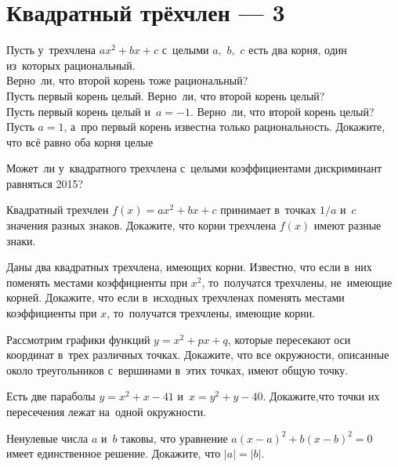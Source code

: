 
\section*{Квадратный трёхчлен --- 3}


\begingroup
    \def\abs#1{\lvert #1 \rvert}

\begin{problems}

\item
Пусть у~трехчлена $ax^2 + bx + c$ с~целыми $a,$ $b,$ $c$ есть два корня, один
из~которых рациональный.
\\
\subproblem
Верно~ли, что второй корень тоже рациональный?
\\
\subproblem
Пусть первый корень целый.
Верно~ли, что второй корень целый?
\\
\subproblem
Пусть первый корень целый и~$a = -1$.
Верно~ли, что второй корень целый?
\\
\subproblem
Пусть $a = 1$, а~про первый корень известна только рациональность.
Докажите, что всё равно оба корня целые

\item
Может~ли у~квадратного трехчлена с~целыми коэффициентами дискриминант равняться
2015?

\item
Квадратный трехчлен $f(x) = ax^2 + bx + c$ принимает в~точках $1/a$ и~$c$
значения разных знаков.
Докажите, что корни трехчлена $f(x)$ имеют разные знаки.

\item
Даны два квадратных трехчлена, имеющих корни.
Известно, что если в~них поменять местами коэффициенты при $x^2$, то~получатся
трехчлены, не~имеющие корней.
Докажите, что если в~исходных трехчленах поменять местами коэффициенты при $x$,
то~получатся трехчлены, имеющие корни.

\item
Рассмотрим графики функций $y = x^2 + px + q$, которые пересекают оси
координат в~трех различных точках.
Докажите, что все окружности, описанные около треугольников с~вершинами в~этих
точках, имеют общую точку.

\item
Есть две параболы $y = x^2 + x - 41$ и~$x = y^2 + y - 40$.
Докажите,что точки их пересечения лежат на~одной окружности.

\item
Ненулевые числа $a$ и~$b$ таковы, что уравнение $a (x - a)^2 + b (x - b)^2 = 0$
имеет единственное решение.
Докажите, что $\abs{a} = \abs{b}$.

\end{problems}

\endgroup %

